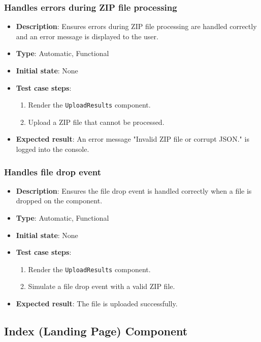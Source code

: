 \documentclass[12pt, titlepage]{article}
\begin{document}
\subsubsection{Handles errors during ZIP file processing}
\begin{itemize}
    \item \textbf{Description}: Ensures errors during ZIP file processing are handled correctly and an error message is displayed to the user.
    \item \textbf{Type}: Automatic, Functional
    \item \textbf{Initial state}: None
    \item \textbf{Test case steps}:
    \begin{enumerate}
        \item Render the \texttt{UploadResults} component.
        \item Upload a ZIP file that cannot be processed.
    \end{enumerate}
    \item \textbf{Expected result}: An error message "Invalid ZIP file or corrupt JSON." is logged into the console.
\end{itemize}

\subsubsection{Handles file drop event}
\begin{itemize}
    \item \textbf{Description}: Ensures the file drop event is handled correctly when a file is dropped on the component.
    \item \textbf{Type}: Automatic, Functional
    \item \textbf{Initial state}: None
    \item \textbf{Test case steps}:
    \begin{enumerate}
        \item Render the \texttt{UploadResults} component.
        \item Simulate a file drop event with a valid ZIP file.
    \end{enumerate}
    \item \textbf{Expected result}: The file is uploaded successfully.
\end{itemize}

\subsection{Index (Landing Page) Component}
\end{document}
